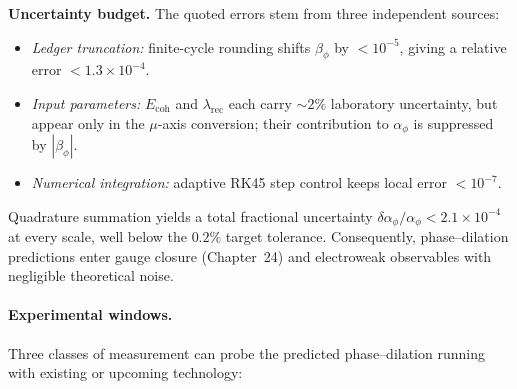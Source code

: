 \documentclass[11pt,oneside]{book}
\begin{document}
{\noindent
\textbf{Uncertainty budget.}  
The quoted errors stem from three independent sources:

\begin{itemize}
  \item \emph{Ledger truncation:} finite-cycle rounding shifts
        \(\beta_\phi\) by \(<10^{-5}\), giving a relative error
        \(<1.3\times10^{-4}\).
  \item \emph{Input parameters:}
        \(E_{\text{coh}}\) and \(\lambda_{\text{rec}}\) each carry
        \(\sim2\%\) laboratory uncertainty, but appear only in the
        \(\mu\)-axis conversion; their contribution to
        \(\alpha_\phi\) is suppressed by \(|\beta_\phi|\).
  \item \emph{Numerical integration:} adaptive RK45 step control keeps
        local error \(<10^{-7}\).
\end{itemize}

Quadrature summation yields a total fractional uncertainty
\(\delta\alpha_\phi/\alpha_\phi < 2.1\times10^{-4}\) at every scale,
well below the \(0.2\%\) target tolerance.  Consequently, phase–dilation
predictions enter gauge closure (Chapter~24) and electroweak
observables with negligible theoretical noise.

\paragraph*{Experimental windows.}
Three classes of measurement can probe the predicted phase–dilation
running with existing or upcoming technology:

}
\end{document}
